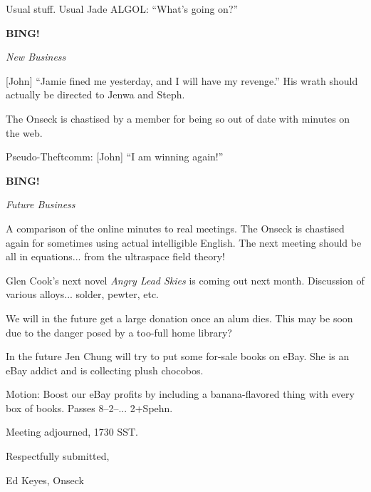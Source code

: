 \documentclass[12pt]{article}
\newcommand{\bing}{{\bf BING!} }
\newcommand{\goto}[1]{\bing \vskip 12pt \centerline{{\em{#1}}}}
\begin{document}
Usual stuff.  Usual Jade ALGOL: ``What's going on?''

\goto{New Business}

[John] ``Jamie fined me yesterday, and I will have my revenge.''  His
wrath should actually be directed to Jenwa and Steph.

The Onseck is chastised by a member for being so out of date with
minutes on the web.

Pseudo-Theftcomm: [John] ``I am winning again!''

\goto{Future Business}

A comparison of the online minutes to real meetings.  The Onseck is
chastised again for sometimes using actual intelligible English.
The next meeting should be all in equations... from the ultraspace
field theory!

Glen Cook's next novel {\em Angry Lead Skies} is coming out next
month.  Discussion of various alloys... solder, pewter, etc.

We will in the future get a large donation once an alum dies.  This
may be soon due to the danger posed by a too-full home library?

In the future Jen Chung will try to put some for-sale books on eBay.
She is an eBay addict and is collecting plush chocobos.

Motion: Boost our eBay profits by including a banana-flavored thing
with every box of books.  Passes 8--2--... 2+Spehn.

\vspace{12pt}

\noindent
Meeting adjourned, 1730 SST.

\vspace{18pt}

\centerline{Respectfully submitted,}
\centerline{Ed Keyes, Onseck}
\end{document}
